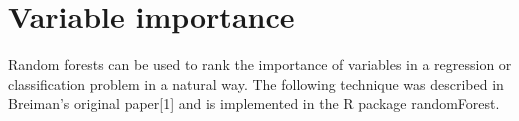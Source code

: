 \documentclass[caret-main.tex]{subfiles}
\begin{document}
\section{Variable importance}
Random forests can be used to rank the importance of variables in a regression or classification problem in a natural way. 
The following technique was described in Breiman's original paper[1] and is implemented in the R package randomForest.

\end{document}
